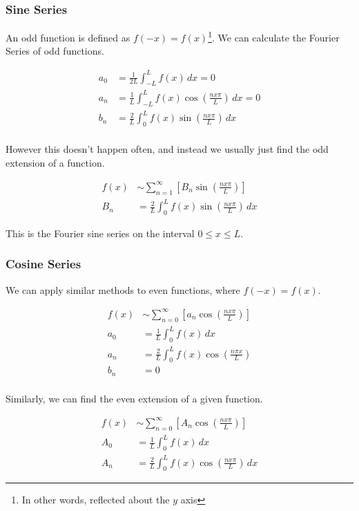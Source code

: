         \subsubsection{Sine Series}
        An odd function is defined as $f(-x) = f(x)$\footnote{In other words, reflected about the $y$ axis}. We can
        calculate the Fourier Series of odd functions.

        \begin{align*}
            a_0 &= \frac{1}{2L} \int_{-L}^L f(x) \, dx = 0\\
            a_n &= \frac{1}{L} \int_{-L}^L f(x) \cos\left(\frac{nx\pi}{L}\right) \, dx = 0\\
            b_n &= \frac{2}{L} \int_0^L f(x) \sin\left(\frac{nx\pi}{L}\right) \, dx\\
        \end{align*}

        However this doesn't happen often, and instead we usually just find the odd extension of a function.

        \begin{align*}
            f(x) &\sim \sum_{n=1}^\infty \left[ B_n \sin\left(\frac{nx\pi}{L}\right) \right]\\
            B_n &= \frac{2}{L} \int_0^L f(x) \sin\left(\frac{nx\pi}{L}\right) \, dx
        \end{align*}

        This is the Fourier sine series on the interval $0 \le x \le L$.

        \subsubsection{Cosine Series}
        We can apply similar methods to even functions, where $f(-x) = f(x)$.

        \begin{align*}
            f(x) &\sim \sum_{n=0}^\infty \left[ a_n \cos\left(\frac{nx\pi}{L}\right) \right]\\
            a_0 &= \frac{1}{L} \int_0^L f(x) \, dx\\
            a_n &= \frac{2}{L} \int_0^L f(x) \cos\left(\frac{n\pi x}{L}\right)\\
            b_n &= 0\\
        \end{align*}

        Similarly, we can find the even extension of a given function.

        \begin{align*}
            f(x) &\sim \sum_{n=0}^\infty \left[ A_n \cos\left(\frac{nx\pi}{L}\right) \right]\\
            A_0 &= \frac{1}{L} \int_0^L f(x) \, dx\\
            A_n &= \frac{2}{L} \int_0^L f(x) \cos\left(\frac{nx\pi}{L}\right) \, dx
        \end{align*}


